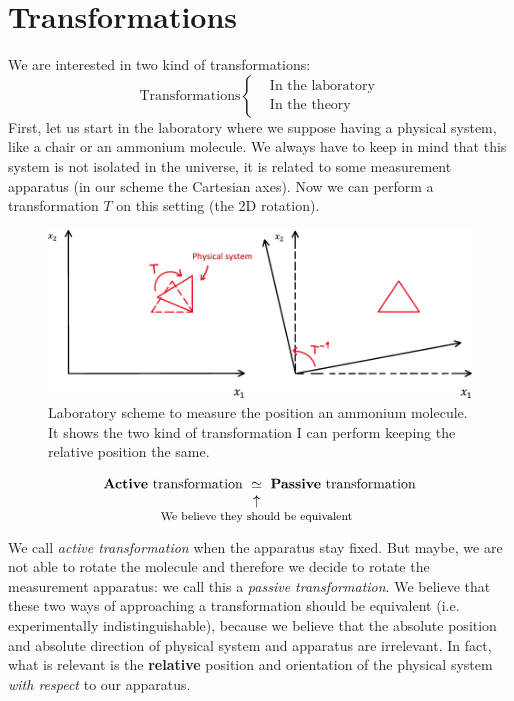 \documentclass[../main.tex]{subfiles}
\begin{document}
\section{Transformations}
We are interested in two kind of transformations:
\[
\textrm{Transformations}
\begin{cases}
&\textrm{In the laboratory}\\
&\textrm{In the theory}
\end{cases}
\]
First, let us start in the laboratory where we suppose having a physical system, like a chair or an ammonium molecule. We always have to keep in mind that this system is not isolated in the universe, it is related to some measurement apparatus (in our scheme the Cartesian axes). Now we can perform a transformation $T$ on this setting (the 2D rotation\sidenote{\[ T =
\begin{bmatrix}
  \cos \theta & -\sin \theta\\
  \sin \theta &  \cos \theta
\end{bmatrix}\]}).
\begin{figure}[H]
	\includegraphics[width=1\textwidth]{images/Laboratory_scheme.pdf}
	\caption[Laboratory scheme]{Laboratory scheme to measure the position an ammonium molecule. It shows the two kind of transformation I can perform keeping the relative position the same.}
\end{figure}
\[
\textrm{\textbf{Active} transformation}\ \underset{\mathclap{\tikz \node {$\uparrow$} node [below=1ex] {\footnotesize We believe they should be equivalent};}}{\simeq}\ \textrm{\textbf{Passive} transformation}
\]
We call \textit{active transformation} when the apparatus stay fixed. But maybe, we are not able to rotate the molecule and therefore we decide to rotate the measurement apparatus: we call this a \textit{passive transformation}. We believe that these two ways of approaching a transformation should be equivalent (i.e. experimentally indistinguishable), because we believe that the absolute position and absolute direction of physical system and apparatus are irrelevant. In fact, what is relevant is the \textbf{relative} position and orientation of the physical system \textit{with respect} to our apparatus.
\end{document}
